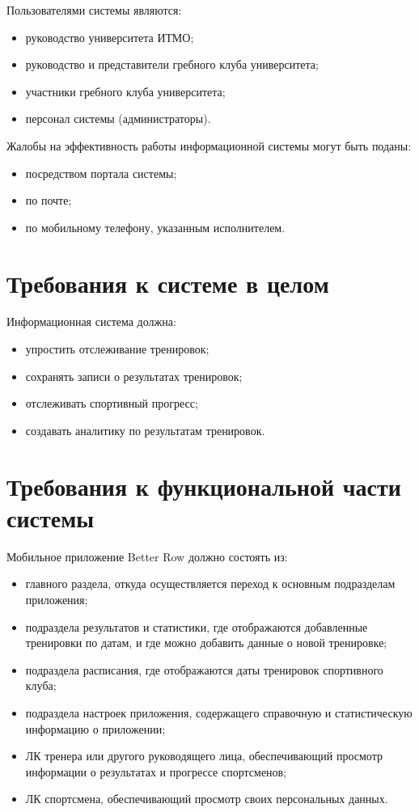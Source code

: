 \documentclass[14pt]{extreport}
\begin{document}
Пользователями системы являются:
\begin{itemize}
\item руководство университета ИТМО;
\item руководство и представители гребного клуба университета;
\item участники гребного клуба университета;
\item персонал системы (администраторы).
\end{itemize}

Жалобы на эффективность работы информационной системы могут быть поданы:
\begin{itemize}
\item посредством портала системы;
\item по почте;
\item по мобильному телефону, указанным исполнителем.
\end{itemize}

\section{Требования к системе в целом}

Информационная система должна:
\begin{itemize}
\item упростить отслеживание тренировок;
\item сохранять записи о результатах тренировок;
\item отслеживать спортивный прогресс;
\item создавать аналитику по результатам тренировок.
\end{itemize}

\section{Требования к функциональной части системы}

Мобильное приложение Better Row должно состоять из:
\begin{itemize}
\item главного раздела, откуда осуществляется переход к основным подразделам приложения;
\item подраздела результатов и статистики, где отображаются добавленные тренировки по датам, и где можно добавить данные о новой тренировке;
\item подраздела расписания, где отображаются даты тренировок спортивного клуба;
\item подраздела настроек приложения, содержащего справочную и статистическую
информацию о приложении;
\item ЛК тренера или другого руководящего лица, обеспечивающий просмотр информации о результатах и прогрессе спортсменов;
\item ЛК спортсмена, обеспечивающий просмотр своих персональных данных.
\end{itemize}
\end{document}
